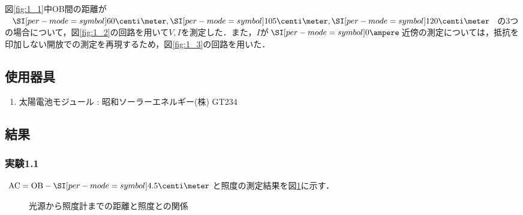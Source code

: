 \documentclass[1_power_supply.tex]{subfiles}
\begin{document}
図\ref{fig:1_1}中OB間の距離が$\SIs{60}{\centi\meter},\SIs{105}{\centi\meter},\SIs{120}{\centi\meter}$の3つの場合について，図\ref{fig:1_2}の回路を用いて$V,I$を測定した．また，$I$が$\SIs{0}{\ampere}$近傍の測定については，抵抗を印加しない開放での測定を再現するため，図\ref{fig:1_3}の回路を用いた．

\subsection{使用器具}

\begin{enumerate}
	\item 太陽電池モジュール : 昭和ソーラーエネルギー(株) GT234
\end{enumerate}

\subsection{結果}

\subsubsection{実験1.1}

$\mathrm{AC}=\mathrm{OB}-\SIs{4.5}{\centi\meter}$と照度の測定結果を図\ref{fig:1_dE}に示す．

\begin{figure}[htbp]
	\begin{center}
		\caption{光源から照度計までの距離と照度との関係}\label{fig:1_dE}
	\end{center}
\end{figure}
\end{document}
